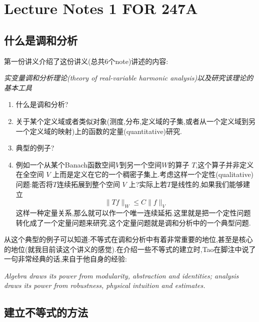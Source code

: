 \section{Lecture Notes 1 FOR 247A}
\subsection{什么是调和分析}
第一份讲义介绍了这份讲义(总共6个note)讲述的内容:
\begin{framed}
\begin{center}
  \textit{实变量调和分析理论(theory of real-variable harmonic analysis)以及研究该理论的基本工具}
\end{center}
\end{framed}
\begin{enumerate}
  \item 什么是调和分析?
  \item [] 关于某个定义域或者类似对象(测度,分布,定义域的子集,或者从一个定义域到另一个定义域的映射)上的函数的定量(quantitative)研究.
  \item 典型的例子?
  \item [] 例如一个从某个Banach函数空间$V$到另一个空间$W$的算子 $T$,这个算子并非定义在全空间 $V$ 上而是定义在它的一个稠密子集上.考虑这样一个定性(qualitative)问题:能否将$T$连续拓展到整个空间 $V$ 上?实际上若$T$是线性的,如果我们能够建立
    \[
    \|Tf\|_{W}\le C\|f\|_{V}
    \] 
    这样一种定量关系,那么就可以作一个唯一连续延拓.这里就是把一个定性问题转化成了一个定量问题来研究,这个定量问题就是调和分析中的一个典型问题.
\end{enumerate}

从这个典型的例子可以知道:不等式在调和分析中有着非常重要的地位,甚至是核心的地位(就我目前读这个讲义的感觉).在介绍一些不等式的建立时,Tao在脚注中说了一句非常经典的话,来自于他自身的经验:
\begin{framed}
\begin{center}
  \textit{Algebra draws its power from modularity, abstraction and identities; analysis draws its power from robustness, physical intuition and estimates.}
\end{center}
\end{framed}

\subsection{建立不等式的方法}

